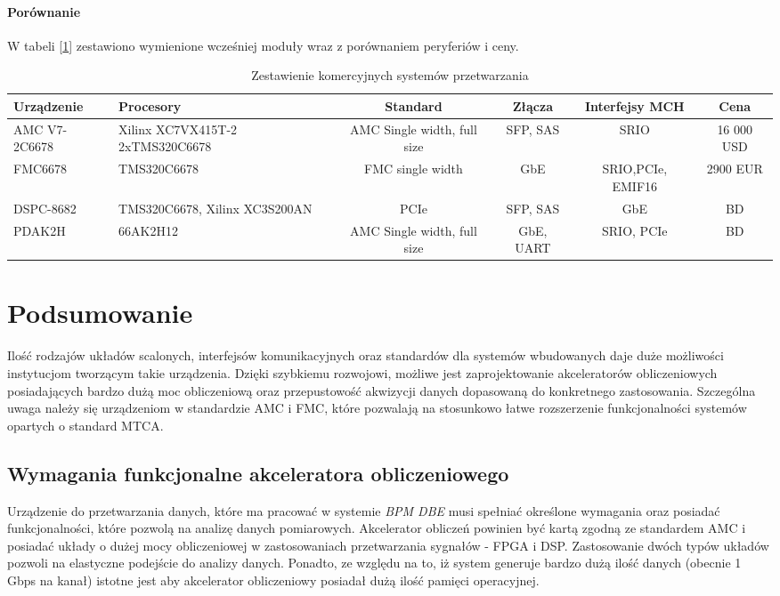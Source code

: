 \paragraph{Porównanie}	
W tabeli [\ref{tbl:cots}] zestawiono wymienione wcześniej moduły wraz z porównaniem peryferiów i ceny.
\begin{table}[here]
\centering
\scriptsize
	\caption{Zestawienie komercyjnych systemów przetwarzania}
    \begin{tabular}{p{2.5cm}| p{2.5cm} |c|c|c|c}
	\toprule
    \textbf{Urządzenie} & \textbf{Procesory} & \textbf{Standard} & \textbf{Złącza}  & \textbf{Interfejsy MCH}  & \textbf{Cena}\\
    \midrule
    AMC V7-2C6678 	& 	Xilinx XC7VX415T-2  2xTMS320C6678  	& 	AMC Single width, full size		&	SFP, SAS	&	 	SRIO				&	16 000 USD\\
    FMC6678		& 	TMS320C6678  				& 	FMC single width			&	GbE		&	 	SRIO,PCIe, EMIF16		&	2900  EUR\\
    DSPC-8682 	& 	TMS320C6678, Xilinx XC3S200AN  	& 	PCIe					&	SFP, SAS	&	 	GbE				&	BD\\
    PDAK2H 		& 	66AK2H12				  	& 	AMC Single width, full size		&	GbE, UART	&	 	SRIO, PCIe			&	BD\\
    \end{tabular}

	\label{tbl:cots}
\end{table}

\section{Podsumowanie} 

Ilość rodzajów układów scalonych, interfejsów komunikacyjnych oraz standardów dla systemów wbudowanych daje duże możliwości instytucjom tworzącym takie urządzenia. Dzięki szybkiemu rozwojowi, możliwe jest zaprojektowanie akceleratorów obliczeniowych posiadających bardzo dużą moc obliczeniową oraz przepustowość akwizycji danych dopasowaną do konkretnego zastosowania. Szczególna uwaga należy się urządzeniom w standardzie AMC i FMC, które pozwalają na stosunkowo łatwe rozszerzenie funkcjonalności systemów opartych o standard MTCA. 

\subsection{Wymagania funkcjonalne akceleratora obliczeniowego}
Urządzenie do przetwarzania danych, które ma pracować w systemie \textit{BPM DBE} musi spełniać określone wymagania oraz posiadać funkcjonalności, które pozwolą na analizę danych pomiarowych. Akcelerator obliczeń powinien być kartą zgodną ze standardem AMC i posiadać układy o dużej mocy obliczeniowej w zastosowaniach przetwarzania sygnałów - FPGA i DSP. Zastosowanie dwóch typów układów pozwoli na elastyczne podejście do analizy danych. Ponadto, ze względu na to, iż system generuje bardzo dużą ilość danych (obecnie 1 Gbps na kanał) istotne jest aby akcelerator obliczeniowy posiadał dużą ilość pamięci operacyjnej. 

